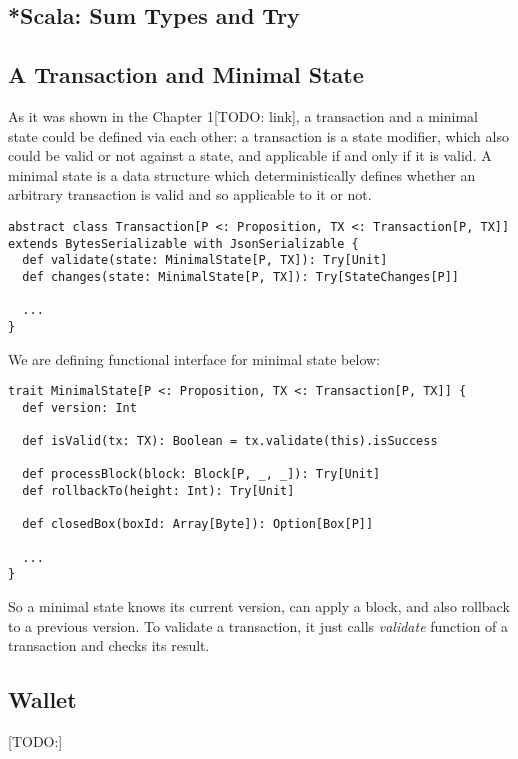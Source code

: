 \documentclass[]{report}   %
\begin{document}
\subsection{*Scala: Sum Types and Try}

\subsection{A Transaction and Minimal State}

As it was shown in the Chapter 1[TODO: link], a transaction and a minimal state could be defined via each other: a transaction is a state modifier, which also could be valid or not against a state, and applicable if and only if it is valid. A minimal state is a data structure which deterministically defines whether an arbitrary transaction is valid and so applicable to it or not. 

\begin{lstlisting}
abstract class Transaction[P <: Proposition, TX <: Transaction[P, TX]] extends BytesSerializable with JsonSerializable {
  def validate(state: MinimalState[P, TX]): Try[Unit]
  def changes(state: MinimalState[P, TX]): Try[StateChanges[P]]

  ...
}
\end{lstlisting}

We are defining functional interface for minimal state below:

\begin{lstlisting}
trait MinimalState[P <: Proposition, TX <: Transaction[P, TX]] {
  def version: Int

  def isValid(tx: TX): Boolean = tx.validate(this).isSuccess

  def processBlock(block: Block[P, _, _]): Try[Unit]
  def rollbackTo(height: Int): Try[Unit]

  def closedBox(boxId: Array[Byte]): Option[Box[P]]

  ...
}
\end{lstlisting}

So a minimal state knows its current version, can apply a block, and also rollback to a previous version. To validate a transaction, it just calls \textit{validate} function of a transaction and checks its result.

\subsection{Wallet}

[TODO:]
\end{document}

